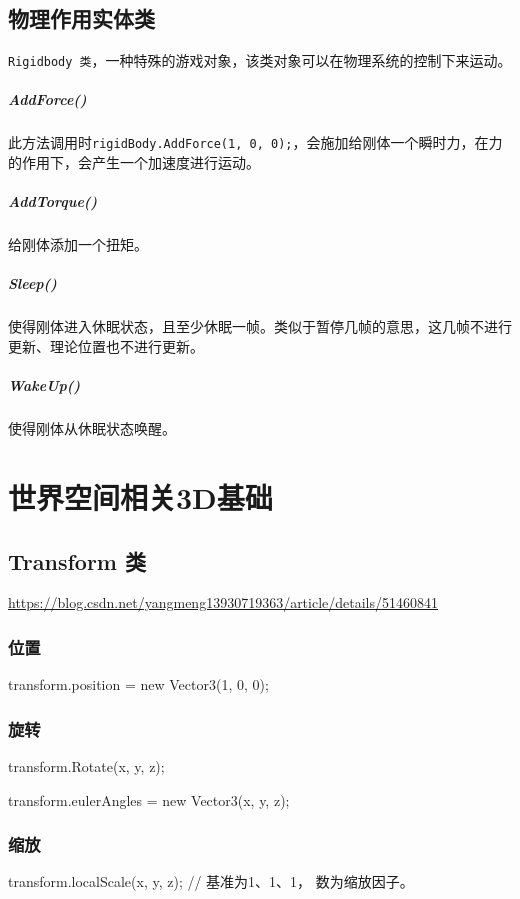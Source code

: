 \documentclass[UTF8,a4paper,12pt]{ctexbook}
\begin{document}
	\section{物理作用实体类} \verb|Rigidbody 类|，一种特殊的游戏对象，该类对象可以在物理系统的控制下来运动。
		\paragraph{AddForce()}
			此方法调用时\verb|rigidBody.AddForce(1, 0, 0);|，会施加给刚体一个瞬时力，在力的作用下，会产生一个加速度进行运动。
			
		\paragraph{AddTorque()}
			给刚体添加一个扭矩。
			
		\paragraph{Sleep()}
			使得刚体进入休眠状态，且至少休眠一帧。类似于暂停几帧的意思，这几帧不进行更新、理论位置也不进行更新。
			
		\paragraph{WakeUp()}
			使得刚体从休眠状态唤醒。
		
\chapter{世界空间相关3D基础}
	\section{Transform 类}
		\url{https://blog.csdn.net/yangmeng13930719363/article/details/51460841}
		\subsection{位置}
				transform.position = new Vector3(1, 0, 0);
		\subsection{旋转}	
				transform.Rotate(x, y, z);
				
				transform.eulerAngles = new Vector3(x, y, z);	
		\subsection{缩放}
				transform.localScale(x, y, z); // 基准为1、1、1， 数为缩放因子。	
\end{document}
